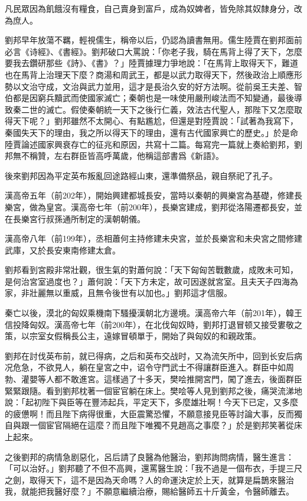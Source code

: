 凡民眾因為飢餓沒有糧食，自己賣身到富戶，成為奴婢者，皆免除其奴隸身分，改為庶人。

劉邦早年放蕩不羈，輕視儒生，稱帝以后，仍認為讀書無用。儒生陸賈在劉邦面前必言《诗經》、《書經》。劉邦破口大罵說：「你老子我，騎在馬背上得了天下，怎麼要我去鑽研那些《詩》、《書》？」陸賈據理力爭地說：「在馬背上取得天下，難道也在馬背上治理天下麼？商湯和周武王，都是以武力取得天下，然後政治上順應形勢以文治守成，文治與武力並用，這才是長治久安的好方法啊。從前吳王夫差、智伯都是因窮兵黷武而使國家滅亡；秦朝也是一味使用嚴刑峻法而不知變通，最後導致秦二世的滅亡。假使秦朝統一天下之後行仁義，效法古代聖人，那陛下又怎麼取得天下呢？」劉邦雖然不太開心、有點尷尬，但還是對陸賈說：「試著為我寫下，秦國失天下的理由，我之所以得天下的理由，還有古代國家興亡的歷史。」於是命陸賈論述國家興衰存亡的征兆和原因，共寫十二篇。每寫完一篇就上奏給劉邦，劉邦無不稱贊，左右群臣皆高呼萬歲，他稱這部書爲《新語》。

後來劉邦因為平定英布叛亂回途路經山東，還準備祭品，親自祭祀了孔子。

漢高帝五年（前202年），開始興建都城長安，當時以秦朝的興樂宮為基礎，修建長樂宮，做為皇宮。漢高帝七年（前200年），長樂宮建成，劉邦從洛陽遷都長安，並在長樂宮行叔孫通所制定的漢朝朝儀。

漢高帝八年（前199年），丞相蕭何主持修建未央宮，並於長樂宮和未央宮之間修建武庫，又於長安東南修建太倉。

劉邦看到宮殿非常壯觀，很生氣的對蕭何說：「天下匈匈苦戰數歲，成敗未可知，是何治宮室過度也？」蕭何說：「天下方未定，故可因遂就宮室。且夫天子四海為家，非壯麗無以重威，且無令後世有以加也。」劉邦這才信服。

秦亡以後，漠北的匈奴乘機南下騷擾漢朝北方邊境。漢高帝六年（前201年），韓王信投降匈奴。漢高帝七年（前200年），在北伐匈奴時，劉邦打退冒顿又接受婁敬之策，以宗室女假稱長公主，遠嫁冒頓單于，開始了與匈奴的和親政策。

劉邦在討伐英布前，就已得病，之后和英布交战时，又為流矢所中，回到长安后病况危急，不欲見人，躺在皇宮之中，诏令守門武士不得讓群臣進入。群臣中如周勃、灌嬰等人都不敢進宮。這樣過了十多天，樊哙推開宮門，闖了進去，後面群臣緊緊跟隨。看到劉邦枕著一個宦官躺在床上。樊哙等人見到劉邦之後，痛哭流涕地說：「起初陛下與臣等在豐沛起兵，平定天下，多麼雄壯啊！今天下已定，又多麼的疲憊啊！而且陛下病得很重，大臣震驚恐懼，不願意接見臣等討論大事，反而獨自與跟一個宦官隔絕在這麼？而且陛下唯獨不見趙高之事麼？」於是劉邦笑著從床上起來。

之後劉邦的病情急剧惡化，呂后請了良醫為他醫治，劉邦詢問病情，醫生進言：「可以治好。」劉邦聽了不但不高興，還罵醫生說：「我不過是一個布衣，手提三尺之劍，取得天下，這不是因為天命嗎？人的命運決定於上天，就算是扁鵲來醫治我，就能把我醫好麼？」不願意繼續治療，賜給醫師五十斤黃金，令醫師離去。

